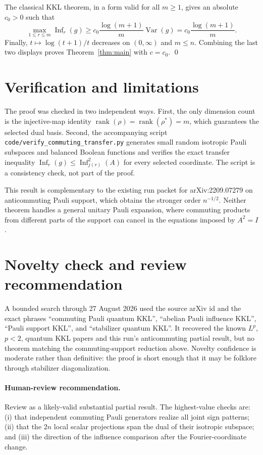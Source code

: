 \documentclass[11pt]{article}
\newcommand{\Inf}{\operatorname{Inf}}
\begin{document}
The classical KKL theorem, in a form valid for all $m\geq1$, gives an absolute
$c_0>0$ such that
\[
 \max_{1\leq r\leq m}\Inf_r(g)
 \geq c_0\frac{\log(m+1)}{m}\operatorname{Var}(g)
 =c_0\frac{\log(m+1)}{m}.
\]
Finally, $t\mapsto\log(t+1)/t$ decreases on $(0,\infty)$ and $m\leq n$.
Combining the last two displays proves Theorem~\ref{thm:main} with $c=c_0$.
\qed

\section{Verification and limitations}

The proof was checked in two independent ways.  First, the only dimension
count is the injective-map identity
$\operatorname{rank}(\rho)=\operatorname{rank}(\rho^*)=m$, which guarantees
the selected dual basis.  Second, the accompanying script
\texttt{code/verify\_commuting\_transfer.py} generates small random isotropic
Pauli subspaces and balanced Boolean functions and verifies the exact transfer
inequality $\Inf_r(g)\leq\Inf_{j(r)}^2(A)$ for every selected coordinate.  The
script is a consistency check, not part of the proof.

This result is complementary to the existing run packet for arXiv:2209.07279
on anticommuting Pauli support, which obtains the stronger order $n^{-1/2}$.
Neither
theorem handles a general unitary Pauli expansion, where commuting products
from different parts of the support can cancel in the equations imposed by
$A^2=I$.

\section{Novelty check and review recommendation}

A bounded search through 27 August 2026 used the source arXiv id and the exact
phrases ``commuting Pauli quantum KKL'', ``abelian Pauli influence KKL'',
``Pauli support KKL'', and ``stabilizer quantum KKL''.  It recovered the known
$L^p$, $p<2$, quantum KKL papers and this run's anticommuting partial result,
but no theorem matching the commuting-support reduction above.  Novelty
confidence is moderate rather than definitive: the proof is short enough that
it may be folklore through stabilizer diagonalization.

\paragraph{Human-review recommendation.}
Review as a likely-valid substantial partial result.  The highest-value checks
are: (i) that independent commuting Pauli generators realize all joint sign
patterns; (ii) that the $2n$ local scalar projections span the dual of their
isotropic subspace; and (iii) the direction of the influence comparison after
the Fourier-coordinate change.
\end{document}
